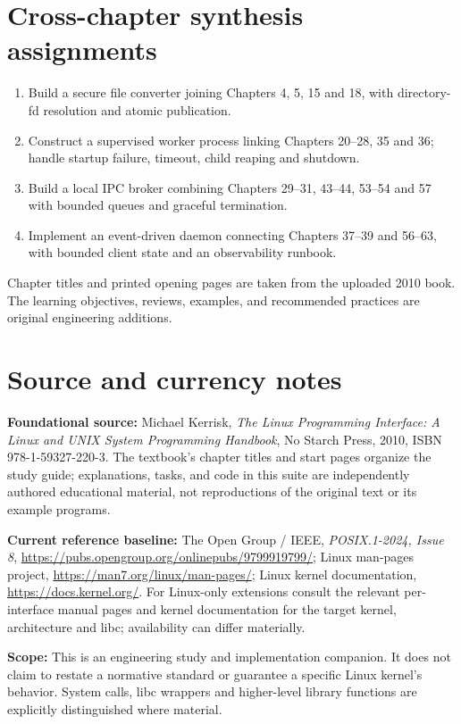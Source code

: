\documentclass[11pt,letterpaper,oneside]{report}
\begin{document}
\chapter{Cross-chapter synthesis assignments}
\begin{enumerate}
\item Build a secure file converter joining Chapters 4, 5, 15 and 18, with directory-fd resolution and atomic publication.
\item Construct a supervised worker process linking Chapters 20--28, 35 and 36; handle startup failure, timeout, child reaping and shutdown.
\item Build a local IPC broker combining Chapters 29--31, 43--44, 53--54 and 57 with bounded queues and graceful termination.
\item Implement an event-driven daemon connecting Chapters 37--39 and 56--63, with bounded client state and an observability runbook.
\end{enumerate}
\begin{engineeringnote}
Chapter titles and printed opening pages are taken from the uploaded 2010 book. The learning objectives, reviews, examples, and recommended practices are original engineering additions.
\end{engineeringnote}

\chapter*{Source and currency notes}
\textbf{Foundational source:} Michael Kerrisk, \emph{The Linux Programming Interface: A Linux and UNIX System Programming Handbook}, No Starch Press, 2010, ISBN 978-1-59327-220-3. The textbook's chapter titles and start pages organize the study guide; explanations, tasks, and code in this suite are independently authored educational material, not reproductions of the original text or its example programs.

\textbf{Current reference baseline:} The Open Group / IEEE, \emph{POSIX.1-2024, Issue 8}, \url{https://pubs.opengroup.org/onlinepubs/9799919799/}; Linux man-pages project, \url{https://man7.org/linux/man-pages/}; Linux kernel documentation, \url{https://docs.kernel.org/}. For Linux-only extensions consult the relevant per-interface manual pages and kernel documentation for the target kernel, architecture and libc; availability can differ materially.

\textbf{Scope:} This is an engineering study and implementation companion. It does not claim to restate a normative standard or guarantee a specific Linux kernel's behavior. System calls, libc wrappers and higher-level library functions are explicitly distinguished where material.
\end{document}
